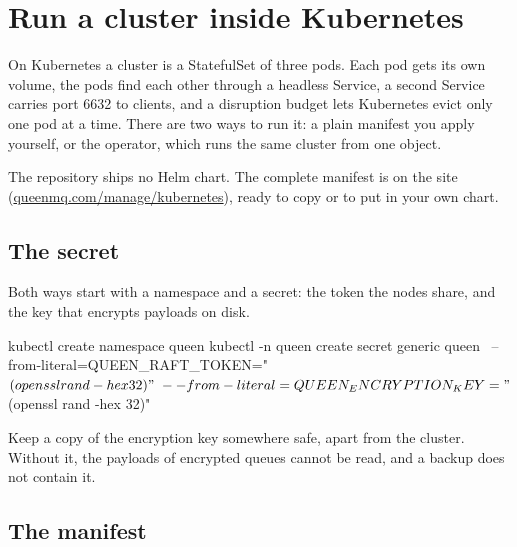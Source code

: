 %

\section{Run a cluster inside Kubernetes}

On Kubernetes a cluster is a StatefulSet of three pods. Each pod gets its own volume, the pods
find each other through a headless Service, a second Service carries port 6632 to clients, and a
disruption budget lets Kubernetes evict only one pod at a time. There are two ways to run it: a
plain manifest you apply yourself, or the operator, which runs the same cluster from one object.


The repository ships no Helm chart. The complete manifest is on the site
(\href{https://queenmq.com/manage/kubernetes/}{queenmq.com/manage/kubernetes}), ready to copy
or to put in your own chart.

\subsection{The secret}

Both ways start with a namespace and a secret: the token the nodes share, and the key that
encrypts payloads on disk.

\begin{shell}
kubectl create namespace queen
kubectl -n queen create secret generic queen \
  --from-literal=QUEEN_RAFT_TOKEN="$(openssl rand -hex 32)" \
  --from-literal=QUEEN_ENCRYPTION_KEY="$(openssl rand -hex 32)"
\end{shell}

Keep a copy of the encryption key somewhere safe, apart from the cluster. Without it, the payloads
of encrypted queues cannot be read, and a backup does not contain it.

\subsection{The manifest}

